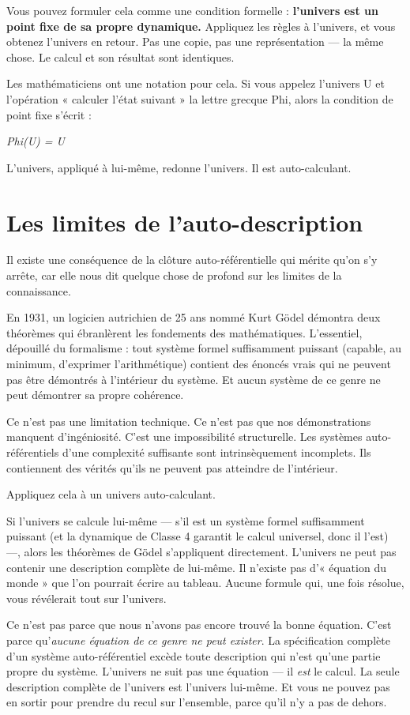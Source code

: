 \documentclass[11pt, twoside, openright]{book}
\begin{document}
Vous pouvez formuler cela comme une condition formelle : \textbf{l'univers est un point fixe de sa propre dynamique.} Appliquez les règles à l'univers, et vous obtenez l'univers en retour. Pas une copie, pas une représentation --- la même chose. Le calcul et son résultat sont identiques.

Les mathématiciens ont une notation pour cela. Si vous appelez l'univers U et l'opération « calculer l'état suivant » la lettre grecque Phi, alors la condition de point fixe s'écrit :

\textit{Phi(U) = U}

L'univers, appliqué à lui-même, redonne l'univers. Il est auto-calculant.


\section*{Les limites de l'auto-description}

Il existe une conséquence de la clôture auto-référentielle qui mérite qu'on s'y arrête, car elle nous dit quelque chose de profond sur les limites de la connaissance.

En 1931, un logicien autrichien de 25 ans nommé Kurt Gödel démontra deux théorèmes qui ébranlèrent les fondements des mathématiques. L'essentiel, dépouillé du formalisme : tout système formel suffisamment puissant (capable, au minimum, d'exprimer l'arithmétique) contient des énoncés vrais qui ne peuvent pas être démontrés à l'intérieur du système. Et aucun système de ce genre ne peut démontrer sa propre cohérence.

Ce n'est pas une limitation technique. Ce n'est pas que nos démonstrations manquent d'ingéniosité. C'est une impossibilité structurelle. Les systèmes auto-référentiels d'une complexité suffisante sont intrinsèquement incomplets. Ils contiennent des vérités qu'ils ne peuvent pas atteindre de l'intérieur.

Appliquez cela à un univers auto-calculant.

Si l'univers se calcule lui-même --- s'il est un système formel suffisamment puissant (et la dynamique de Classe 4 garantit le calcul universel, donc il l'est) ---, alors les théorèmes de Gödel s'appliquent directement. L'univers ne peut pas contenir une description complète de lui-même. Il n'existe pas d'« équation du monde » que l'on pourrait écrire au tableau. Aucune formule qui, une fois résolue, vous révélerait tout sur l'univers.

Ce n'est pas parce que nous n'avons pas encore trouvé la bonne équation. C'est parce qu'\textit{aucune équation de ce genre ne peut exister}. La spécification complète d'un système auto-référentiel excède toute description qui n'est qu'une partie propre du système. L'univers ne suit pas une équation --- il \textit{est} le calcul. La seule description complète de l'univers est l'univers lui-même. Et vous ne pouvez pas en sortir pour prendre du recul sur l'ensemble, parce qu'il n'y a pas de dehors.
\end{document}
